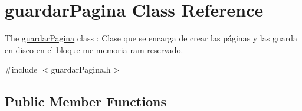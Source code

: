 \hypertarget{classguardar_pagina}{}\section{guardar\+Pagina Class Reference}
\label{classguardar_pagina}


The \hyperlink{classguardar_pagina}{guardar\+Pagina} class \+: Clase que se encarga de crear las páginas y las guarda en disco en el bloque me memoria ram reservado.  




{\ttfamily \#include $<$guardar\+Pagina.\+h$>$}

\subsection*{Public Member Functions}

